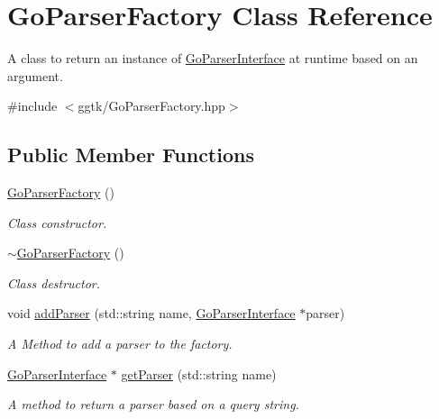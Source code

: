 \hypertarget{classGoParserFactory}{}\section{Go\+Parser\+Factory Class Reference}
\label{classGoParserFactory}


A class to return an instance of \hyperlink{classGoParserInterface}{Go\+Parser\+Interface} at runtime based on an argument.  




{\ttfamily \#include $<$ggtk/\+Go\+Parser\+Factory.\+hpp$>$}

\subsection*{Public Member Functions}
\begin{DoxyCompactItemize}
\item 
\hyperlink{classGoParserFactory_ae6a6141ff3e9e10edb8bd94eed661e97}{Go\+Parser\+Factory} ()
\begin{DoxyCompactList}\small\item\em Class constructor. \end{DoxyCompactList}\item 
\hyperlink{classGoParserFactory_a690c83fe9183f8e49e19c46d7951d5ce}{$\sim$\+Go\+Parser\+Factory} ()
\begin{DoxyCompactList}\small\item\em Class destructor. \end{DoxyCompactList}\item 
void \hyperlink{classGoParserFactory_a93ca2a2c9ae05777d49e95793ce6dbdf}{add\+Parser} (std\+::string name, \hyperlink{classGoParserInterface}{Go\+Parser\+Interface} $\ast$parser)
\begin{DoxyCompactList}\small\item\em A Method to add a parser to the factory. \end{DoxyCompactList}\item 
\hyperlink{classGoParserInterface}{Go\+Parser\+Interface} $\ast$ \hyperlink{classGoParserFactory_a3f3b61ae2954943186646444417911cc}{get\+Parser} (std\+::string name)
\begin{DoxyCompactList}\small\item\em A method to return a parser based on a query string. \end{DoxyCompactList}\end{DoxyCompactItemize}


